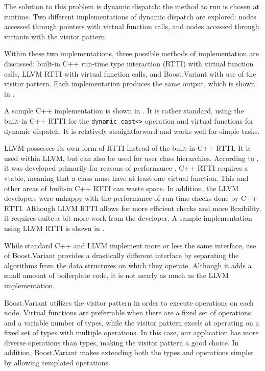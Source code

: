 \documentclass[
abstracton,
fontsize=12pt,
]{scrartcl}
\begin{document}
The solution to this problem is dynamic dispatch: the method to run is chosen at runtime. Two different implementations of dynamic dispatch are explored: nodes accessed through pointers with virtual function calls, and nodes accessed through variants with the visitor pattern.

Within these two implementations, three possible methods of implementation are discussed: built-in C++ run-time type interaction (RTTI) with virtual function calls, LLVM RTTI with virtual function calls, and Boost.Variant with use of the visitor pattern. Each implementation produces the same output, which is shown in .

A sample C++ implementation is shown in . It is rather standard, using the built-in C++ RTTI for the \verb|dynamic_cast<>| operation and virtual functions for dynamic dispatch. It is relatively straightforward and works well for simple tasks.

LLVM possesses its own form of RTTI instead of the built-in C++ RTTI\@. It is used within LLVM, but can also be used for user class hierarchies. According to \citeauthor{so-llvm-rtti}, it was developed primarily for reasons of performance \autocite{so-llvm-rtti}. C++ RTTI requires a vtable, meaning that a class must have at least one virtual function. This and other areas of built-in C++ RTTI can waste space. In addition, the LLVM developers were unhappy with the performance of run-time checks done by C++ RTTI\@. Although LLVM RTTI allows for more efficient checks and more flexibility, it requires quite a bit more work from the developer. A sample implementation using LLVM RTTI is shown in .

While standard C++ and LLVM implement more or less the same interface, use of Boost.Variant provides a drastically different interface by separating the algorithms from the data structures on which they operate. Although it adds a small amount of boilerplate code, it is not nearly as much as the LLVM implementation.

Boost.Variant utilizes the visitor pattern in order to execute operations on each node. Virtual functions are preferrable when there are a fixed set of operations and a variable number of types, while the visitor pattern excels at operating on a fixed set of types with multiple operations. In this case, our application has more diverse operations than types, making the visitor pattern a good choice. In addition, Boost.Variant makes extending both the types and operations simpler by allowing templated operations.
\end{document}
